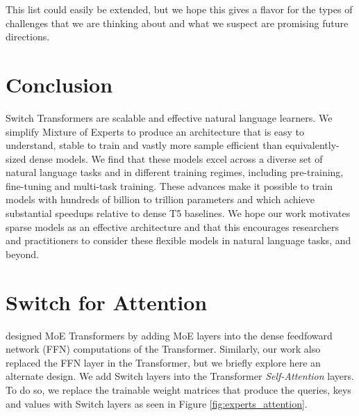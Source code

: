\documentclass[twoside,11pt]{article}
\begin{document}
This list could easily be extended, but we hope this gives a flavor for the types of challenges that we are thinking about and what we suspect are promising future directions.


\section{Conclusion}
Switch Transformers are scalable and effective natural language learners.
We simplify Mixture of Experts to produce an architecture that is easy to understand, stable to train and vastly more sample efficient than equivalently-sized dense models.
We find that these models excel across a diverse set of natural language tasks and in different training regimes, including pre-training, fine-tuning and multi-task training.
These advances make it possible to train models with hundreds of billion to trillion parameters and which achieve substantial speedups relative to dense T5 baselines.
We hope our work motivates sparse models as an effective architecture and that this encourages researchers and practitioners to consider these flexible models in natural language tasks, and beyond.




\appendix

\section{Switch for Attention} \label{app: expert_attention}
\citet{shazeer2018mesh,lepikhin2020gshard} designed MoE Transformers \citep{shazeer2017outrageously} by adding MoE layers into the dense feedfoward network (FFN) computations of the Transformer.
Similarly, our work also replaced the FFN layer in the Transformer, but we briefly explore here an alternate design.
We add Switch layers into the Transformer \emph{Self-Attention} layers.
To do so, we replace the trainable weight matrices that produce the queries, keys and values with Switch layers as seen in Figure \ref{fig:experts_attention}.
\end{document}
